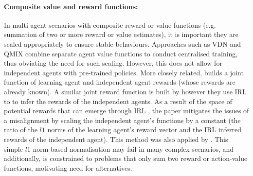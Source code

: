 \paragraph{Composite value and reward functions:} In multi-agent scenarios with composite reward or value functions (e.g. summation of two or more reward or value estimates), it is important they are scaled appropriately to ensure stable behaviours. %
 Approaches such as VDN \cite{VDN} and QMIX \cite{rashid2018qmix} combine separate agent value functions to conduct centralised training, thus obviating the need for such scaling. However, this does not allow for independent agents with pre-trained policies. %
 More closely related, \cite{alamdari2021considerate} builds a joint function of learning agent and independent agent rewards (whose rewards are already known). A similar joint reward function is built by \cite{SympathyPaper} however they use IRL to to infer the rewards of the independent agents.
As a result of the space of potential rewards that can emerge through IRL \cite{PolicyInvariance}, the paper mitigates the issues of a misalignment by scaling the independent agent's functions by a constant (the ratio of the $l1$ norms of the learning agent's reward vector and the IRL inferred rewards of the independent agent). This method was also applied by \cite{Noothigattu2019}. %
This simple $l1$ norm based normalisation may fail in many complex scenarios, and additionally, is constrained to problems that only sum two reward or action-value functions, motivating need for alternatives. %

